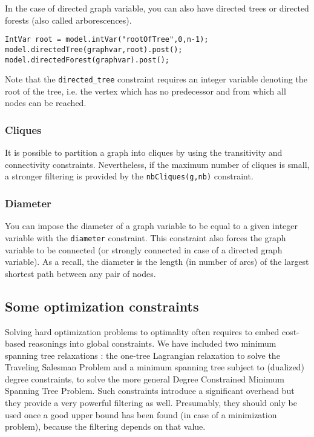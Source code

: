 \documentclass{article}
\begin{document}
In the case of directed graph variable, you can also have directed trees or directed forests (also called arborescences). 
\begin{lstlisting}
IntVar root = model.intVar("rootOfTree",0,n-1);
model.directedTree(graphvar,root).post();
model.directedForest(graphvar).post();
\end{lstlisting}

Note that the \texttt{directed\_tree} constraint \cite{FagesCP11} requires an integer variable denoting the root of the tree, i.e. the vertex which has no predecessor and from which all nodes can be reached. 

\subsubsection{Cliques}

It is possible to partition a graph into cliques by using the transitivity and connectivity constraints. Nevertheless, if the maximum number of cliques is small, a stronger filtering is provided by the \texttt{nbCliques(g,nb)} constraint. 

\subsubsection{Diameter}

You can impose the diameter of a graph variable to be equal to a given integer variable with the \texttt{diameter} constraint. This constraint also forces the graph variable to be connected (or strongly connected in case of a directed graph variable). As a recall, the diameter is the length (in number of arcs) of the largest shortest path between any pair of nodes. 

\subsection{Some optimization constraints}

Solving hard optimization problems to optimality often requires to embed cost-based reasonings into global constraints. 
We have included two minimum spanning tree relaxations : the one-tree Lagrangian relaxation to solve the Traveling Salesman Problem and a minimum spanning tree subject to (dualized) degree constraints, to solve the more general Degree Constrained Minimum Spanning Tree Problem. Such constraints introduce a significant overhead but they provide a very powerful filtering as well. Presumably, they should only be used once a good upper bound has been found (in case of a minimization problem), because the filtering depends on that value. 
\end{document}
